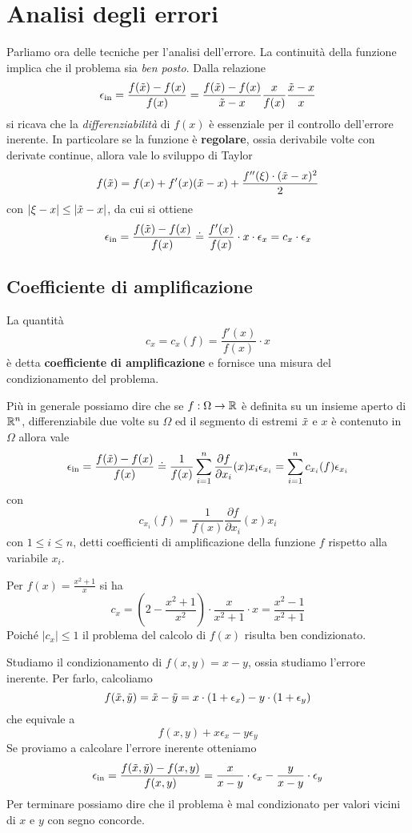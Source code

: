 \section{Analisi degli errori}
Parliamo ora delle tecniche per l'analisi dell'errore. La continuità della funzione implica che il problema sia
\emph{ben posto}. Dalla relazione
\[
	\epsilon_\text{in} = \frac{f(\tilde{x}) - f(x)}{f(x)} =
	\frac{f(\tilde{x}) - f(x)}{\tilde{x} - x} \frac{x}{f(x)} \frac{\tilde{x} - x}{x}
\]
si ricava che la \emph{differenziabilità} di $f(x)$ è essenziale per il controllo dell'errore inerente. In
particolare se la funzione è \textbf{regolare}, ossia derivabile volte con derivate continue, allora vale
lo sviluppo di Taylor
\[ f(\tilde{x}) = f(x) + f'(x) (\tilde{x} - x) + \frac{f''(\xi) \cdot (\tilde{x} - x)^2}{2} \]
con $|\xi - x| \leq |\tilde{x} - x|$, da cui si ottiene
\[
	\epsilon_\text{in} = \frac{f(\tilde{x}) - f(x)}{f(x)} \doteq \frac{f'(x)}{f(x)} \cdot x \cdot \epsilon_x
	= c_x \cdot \epsilon_x
\]

\subsection{Coefficiente di amplificazione}
\begin{definition}
	La quantità
	\[ c_x = c_x (f) = \frac{f'(x)}{f(x)} \cdot x \]
	è detta \textbf{coefficiente di amplificazione} e fornisce una misura del condizionamento del problema.
\end{definition}

Più in generale possiamo dire che se $f : \Omega \to \mathbb{R}$ è definita su un insieme aperto di $\mathbb{R}^n$, differenziabile
due volte su $\Omega$ ed il segmento di estremi $\tilde{x}$ e $x$ è contenuto in $\Omega$ allora vale
\[
	\epsilon_\text{in} = \frac{f(\tilde{x}) - f(x)}{f(x)} \doteq
	\frac{1}{f(x)} \sum_{i=1}^n \frac{\partial f}{\partial x_i} (x) x_i \epsilon_{x_i} =
	\sum_{i=1}^n c_{x_i} (f) \epsilon_{x_i}
\]
con
\[ c_{x_i} (f) = \frac{1}{f(x)} \frac{\partial f}{\partial x_i} (x) x_i \]
con $1 \leq i \leq n$, detti coefficienti di amplificazione della funzione $f$ rispetto alla variabile $x_i$.

\begin{example}
	Per $f(x) = \frac{x^2 + 1}{x}$ si ha
	\[
		c_x = \left( 2 - \frac{x^2 + 1}{x^2} \right) \cdot \frac{x}{x^2 + 1} \cdot x =
		\frac{x^2 - 1}{x^2 + 1}
	\]
	Poiché $|c_x| \leq 1$ il problema del calcolo di $f(x)$ risulta ben condizionato.
\end{example}

\begin{example}
	Studiamo il condizionamento di $f(x, y) = x - y$, ossia studiamo l'errore inerente. Per farlo, calcoliamo
	\[ f(\tilde{x}, \tilde{y}) = \tilde{x} - \tilde{y} = x \cdot (1 + \epsilon_x) - y \cdot (1 + \epsilon_y) \]
	che equivale a
	\[ f(x, y) + x \epsilon_x - y \epsilon_y \]
	Se proviamo a calcolare l'errore inerente otteniamo
	\[
		\epsilon_\text{in} = \frac{f(\tilde{x}, \tilde{y}) - f(x, y)}{f(x, y)} =
		\frac{x}{x - y} \cdot \epsilon_x - \frac{y}{x - y} \cdot \epsilon_y
	\]
	Per terminare possiamo dire che il problema è mal condizionato per valori vicini di $x$ e $y$ con segno
	concorde.
\end{example}

